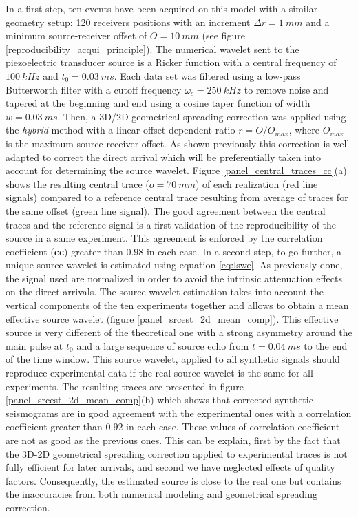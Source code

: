 \documentclass[manuscript,revised]{geophysics}
\begin{document}
\noindent In a first step, ten events have been acquired on this model with a similar geometry setup: 120 receivers positions with an increment $\Delta r= 1\ mm$ and a minimum source-receiver offset of $O=10\ mm$ (see figure \ref{reproducibility_acqui_principle}). The numerical wavelet sent to the piezoelectric transducer source is a Ricker function with a central frequency of $100\ kHz$ and $t_{0}=0.03\ ms$. Each data set was filtered using a low-pass Butterworth filter with a cutoff frequency $\omega_{c}=250\ kHz$ to remove noise and tapered at the beginning and end using a cosine taper function of width $w=0.03\ ms$. Then, a 3D/2D geometrical spreading correction was applied using the \textit{hybrid} method with a linear offset dependent ratio $r=O/O_{max}$, where $O_{max}$ is the maximum source receiver offset. As shown previously this correction is well adapted to correct the direct arrival which will be preferentially taken into account for determining the source wavelet. Figure \ref{panel_central_traces_cc}(a) shows the resulting central trace ($o=70\ mm$) of each realization (red line signals) compared to a reference central trace resulting from average of traces for the same offset (green line signal). The good agreement between the central traces and the reference signal is a first validation of the reproducibility of the source in a same experiment. This agreement is enforced by the correlation coefficient (\textbf{cc}) greater than $0.98$ in each case. In a second step, to go further, a unique source wavelet is estimated using equation \ref{eq:lswe}. As previously done, the signal used are normalized in order to avoid the intrinsic attenuation effects on the direct arrivals. The source wavelet estimation takes into account the vertical components of the ten experiments together and allows to obtain a mean effective source wavelet (figure \ref{panel_srcest_2d_mean_comp}). This effective source is very different of the theoretical one with a strong asymmetry around the main pulse at $t_{0}$ and a large sequence of source echo from $t=0.04\ ms$ to the end of the time window. This source wavelet, applied to all synthetic signals should reproduce experimental data if the real source wavelet is the same for all experiments. The resulting traces are presented in figure \ref{panel_srcest_2d_mean_comp}(b) which shows that corrected synthetic seismograms are in good agreement with the experimental ones with a correlation coefficient greater than $0.92$ in each case. These values of correlation coefficient are not as good as the previous ones. This can be explain, first by the fact that the 3D-2D geometrical spreading correction applied to experimental traces is not fully efficient for later arrivals, and second we have neglected effects of quality factors. Consequently, the estimated source is close to the real one but contains the inaccuracies from both numerical modeling and geometrical spreading correction.   
\end{document}
